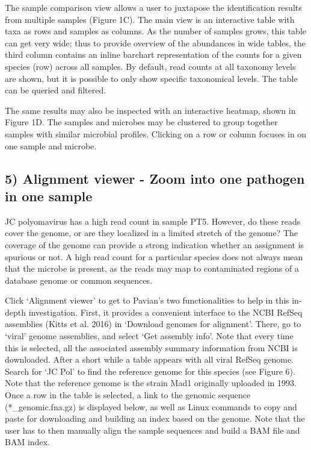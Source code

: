\documentclass[]{article}
\begin{document}
The sample comparison view allows a user to juxtapose the identification
results from multiple samples (Figure 1C). The main view is an
interactive table with taxa as rows and samples as columns. As the
number of samples grows, this table can get very wide; thus to provide
overview of the abundances in wide tables, the third column contains an
inline barchart representation of the counts for a given species (row)
across all samples. By default, read counts at all taxonomy levels are
shown, but it is possible to only show specific taxonomical levels. The
table can be queried and filtered.

The same results may also be inspected with an interactive heatmap,
shown in Figure 1D. The samples and microbes may be clustered to group
together samples with similar microbial profiles. Clicking on a row or
column focuses in on one sample and microbe.

\subsection{5) Alignment viewer - Zoom into one pathogen in one
sample}\label{alignment-viewer---zoom-into-one-pathogen-in-one-sample}

JC polyomavirus has a high read count in sample PT5. However, do these
reads cover the genome, or are they localized in a limited stretch of
the genome? The coverage of the genome can provide a strong indication
whether an assignment is spurious or not. A high read count for a
particular species does not always mean that the microbe is present, as
the reads may map to contaminated regions of a database genome or common
sequences.

Click `Alignment viewer' to get to Pavian's two functionalities to help
in this in-depth investigation. First, it provides a convenient
interface to the NCBI RefSeq assemblies (Kitts et al. 2016) in `Download
genomes for alignment'. There, go to `viral' genome assemblies, and
select `Get assembly info'. Note that every time this is selected, all
the associated assembly summary information from NCBI is downloaded.
After a short while a table appears with all viral RefSeq genome. Search
for `JC Pol' to find the reference genome for this species (see Figure
6). Note that the reference genome is the strain Mad1 originally
uploaded in 1993. Once a row in the table is selected, a link to the
genomic sequence (*\_genomic.fna.gz) is displayed below, as well as
Linux commands to copy and paste for downloading and building an index
based on the genome. Note that the user has to then manually align the
sample sequences and build a BAM file and BAM index.
\end{document}
